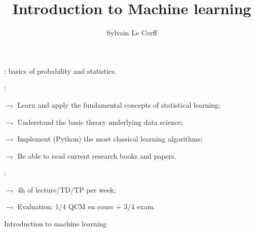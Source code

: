 \documentclass[xcolor={usenames,dvipsnames},handout]{beamer}
\begin{document}
\title[]{Introduction to Machine learning}
\author[]{Sylvain Le Corff}
\date{}

\begin{frame}[plain]
\titlepage
\end{frame}




\begin{frame}
: basics of probability and statistics.

\vspace{.5cm}

:  

\vspace{.2cm}

$\rightharpoondown$ Learn and apply the \alert{fundamental concepts} of statistical learning; 

\vspace{.3cm}

$\rightharpoondown$ Understand the \alert{basic theory} underlying data science;

\vspace{.3cm}


$\rightharpoondown$ Implement (\alert{Python}) the most classical \alert{learning} algorithms;

\vspace{.3cm}

$\rightharpoondown$ Be able to read current research books and papers.

\vspace{.5cm}

: 

\vspace{.2cm}

$\rightharpoondown$ \alert{4h of lecture/TD/TP per week}; 

\vspace{.3cm}

$\rightharpoondown$ \alert{Evaluation}: 1/4 QCM en cours + 3/4 exam.

\end{frame}



\begin{frame}{Introduction to machine learning}
\tableofcontents
\end{frame}
\end{document}
